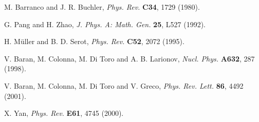 \documentclass{ws-procs9x6}
\begin{document}
\begin{thebibliography}{0}
 M. Barranco and J. R. Buchler, {\it Phys. Rev.}
{\bf C34}, 1729 (1980).

 G. Pang and H. Zhao, {\it J. Phys. A: Math. Gen.}  
{\bf 25}, L527 (1992).

 H. M\"uller and B. D. Serot, {\it Phys. Rev.} {\bf C52}, 
2072 (1995).

 V. Baran, M. Colonna, M. Di Toro and A. B. Larionov, 
{\it Nucl. Phys.} {\bf A632}, 287 (1998).

 V. Baran, M. Colonna, M. Di Toro and V. Greco, 
{\it Phys. Rev. Lett.} {\bf 86}, 4492 (2001).

 X. Yan, {\it Phys. Rev.} {\bf E61}, 4745 (2000).

\end{thebibliography}
\end{document}
